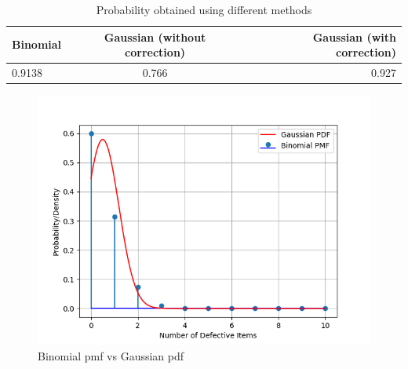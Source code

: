 \documentclass[]{article}
\begin{document}
\begin{enumerate}
\begin{table}[!ht]
\centering
\begin{tabular}{|l|c|r|}
    \hline
    Binomial & Gaussian (without correction) & Gaussian (with correction)\\
    \hline
    0.9138 & 0.766 & 0.927\\
    \hline
\end{tabular}
\caption{Probability obtained using different methods}
\label{tab:gaussian/9/3/7/1}
\end{table}
\begin{figure}[!ht]
\includegraphics[width=\columnwidth]{./figs/fig.png}
\caption{Binomial pmf vs Gaussian pdf}
\label{fig:gaussian/9/3/7/2}
\end{figure}
\end{enumerate}
\end{document}
